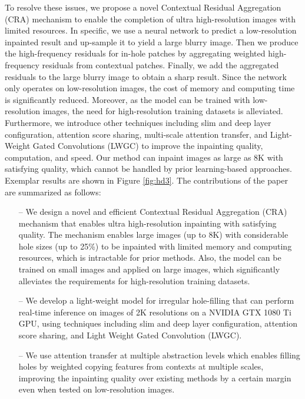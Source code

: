 \documentclass[oribibl]{llncs}  \usepackage[width=122mm,left=12mm,paperwidth=146mm,height=193mm,top=12mm,paperheight=217mm]{geometry}
\begin{document}
To resolve these issues, we propose a novel Contextual Residual Aggregation (CRA) mechanism to enable the completion of ultra high-resolution images with limited resources. In specific, we use a neural network to predict a low-resolution inpainted result and up-sample it to yield a large blurry image. Then we produce the high-frequency residuals for in-hole patches by aggregating weighted high-frequency residuals from contextual patches. Finally, we add the aggregated residuals to the large blurry image to obtain a sharp result. Since the network only operates on low-resolution images, the cost of memory and computing time is significantly reduced. Moreover, as the model can be trained with low-resolution images, the need for high-resolution training datasets is alleviated. Furthermore, we introduce other techniques including slim and deep layer configuration, attention score sharing, multi-scale attention transfer, and Light-Weight Gated Convolutions (LWGC) to improve the inpainting quality, computation, and speed. Our method can inpaint images as large as 8K with satisfying quality, which cannot be handled by prior learning-based approaches. Exemplar results are shown in Figure \ref{fig:hd3}. The contributions of the paper are summarized as follows:
\begin{itemize}
	\item[--]{We design a novel and efficient Contextual Residual Aggregation (CRA) mechanism that enables ultra high-resolution inpainting with satisfying quality. The mechanism enables large images (up to 8K) with considerable hole sizes (up to 25\%) to be inpainted with limited memory and computing resources, which is intractable for prior methods. Also, the model can be trained on small images and applied on large images, which significantly alleviates the requirements for high-resolution training datasets.}
	\item[--]{We develop a light-weight model for irregular hole-filling that can perform real-time inference on images of 2K resolutions on a NVIDIA GTX 1080 Ti GPU, using techniques including slim and deep layer configuration, attention score sharing, and Light Weight Gated Convolution (LWGC).}
	\item[--]{We use attention transfer at multiple abstraction levels which enables filling holes by weighted copying features from contexts at multiple scales, improving the inpainting quality over existing methods by a certain margin even when tested on low-resolution images.}
\end{itemize}
\end{document}

